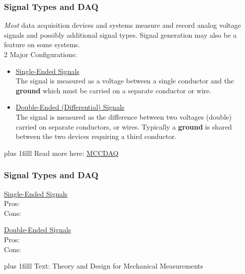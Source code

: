 \documentclass[fleqn]{beamer} %
\newcommand{\sectiontitleI}{Signal Types and DAQ}
\newcommand{\btVFill}{\vskip0pt plus 1filll}
\begin{document}
	\begin{frame}[label=sectionI] \scriptsize
		\frametitle{\sectiontitleI}

		{\it Most} data acquisition devices and systems measure and record {\BL analog} voltage signals and possibly additional signal types. Signal {\GR generation} may also be a feature on some systems. \vspace{5mm}\\

		2 Major Configurations:
		\begin{itemize}
			\item
			\underline{Single-Ended Signals} \vspace{0mm}\\
			The signal is measured as a voltage between a {\PR single} conductor and the {\bf ground} which must be carried on a separate conductor or wire. \vspace{10mm}\\
		
			\item
			\underline{Double-Ended (Differential) Signals} \vspace{0mm}\\			
			The signal is measured as the {\PN difference} between two voltages ({\PN double}) carried on separate conductors, or wires. Typically a {\bf ground} is shared between the two devices requiring a third conductor. 
		\end{itemize}
	
		\btVFill
		\tiny{Read more here: \href{https://www.mccdaq.com/TechTips/TechTip-4.aspx}{MCCDAQ}}
	\end{frame}



	\begin{frame}[label=sectionI] \small
	\frametitle{\sectiontitleI}
		
		\begin{multicols}{2}
			\underline{Single-Ended Signals} \vspace{20mm}\\
			
			Pros:\vspace{10mm}\\
			Cons:
			
			\underline{Double-Ended Signals} \vspace{20mm}\\
			
			Pros:\vspace{10mm}\\
			Cons:
			
			
		\end{multicols}
		\btVFill
		\tiny{Text: Theory and Design for Mechanical Measurements}
	\end{frame}
\end{document}
